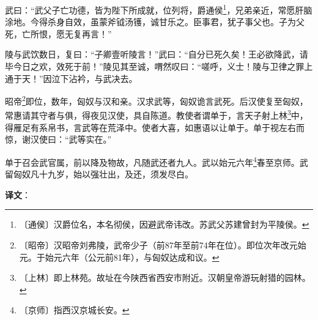 \documentclass[12pt,UTF-8,openany]{ctexbook}
\begin{document}
\begin{normalsize}
    武曰：“武父子亡功德，皆为陛下所成就，位列将，爵通侯\footnote{〔通侯〕汉爵位名，本名彻侯，因避武帝讳改。苏武父苏建曾封为平陵侯。}，兄弟亲近，常愿肝脑涂地。今得杀身自效，虽蒙斧钺汤镬，诚甘乐之。臣事君，犹子事父也。子为父死，亡所恨，愿无复再言！”
    
    陵与武饮数日，复曰：“子卿壹听陵言！”武曰：“自分已死久矣！王必欲降武，请毕今日之欢，效死于前！”陵见其至诚，喟然叹曰：“嗟呼，义士！陵与卫律之罪上通于天！”因泣下沾衿，与武决去。
    
    昭帝\footnote{〔昭帝〕汉昭帝刘弗陵，武帝少子（前87年至前74年在位）。即位次年改元始元。于始元六年（公元前81年），与匈奴达成和议。}即位，数年，匈奴与汉和亲。汉求武等，匈奴诡言武死。后汉使复至匈奴，常惠请其守者与俱，得夜见汉使，具自陈道。教使者谓单于，言天子射上林\footnote{〔上林〕即上林苑。故址在今陕西省西安市附近。汉朝皇帝游玩射猎的园林。}中，得雁足有系帛书，言武等在荒泽中。使者大喜，如惠语以让单于。单于视左右而惊，谢汉使曰：“武等实在。”
    
    单于召会武官属，前以降及物故，凡随武还者九人。武以始元六年\footnote{〔京师〕指西汉京城长安。}春至京师。武留匈奴凡十九岁，始以强壮出，及还，须发尽白。
\end{normalsize}


\newpage

\textbf{译文}：

\vspace{1em}
\end{document}
